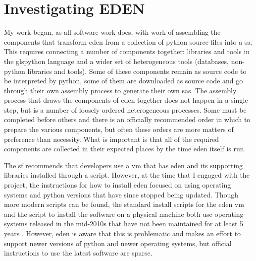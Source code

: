 \documentclass[a4paper,man,natbib]{apa6}
\begin{document}
  \section*{Investigating EDEN}
   My work began, as all software work does, with work of assembling the components that transform \acrshort{eden} from a collection of \gls{python} source files into a \gls{sa}. This requires connecting a number of components together: libraries and tools in the gls{python} language and a wider set of heterogeneous tools (databases, non-\gls{python} libraries and tools). Some of these components remain as source code to be interpreted by \gls{python}, some of them are downloaded as source code and go through their own assembly process to generate their own \glspl{sa}. The assembly process that draws the components of \acrshort{eden} together does not happen in a single step, but is a number of loosely ordered heterogeneous processes. Some must be completed before others and there is an officially recommended order in which to prepare the various components, but often these orders are more matters of preference than necessity. What is important is that all of the required components are collected in their expected places by the time \acrshort{eden} itself is run. 

   The \gls{sf} recommends that developers use a \gls{vm} that has \acrshort{eden} and its supporting libraries installed through a script. However, at the time that I engaged with the project, the instructions for how to install \acrshort{eden} focused on using operating systems and \gls{python} versions that have since stopped being updated. Though more modern scripts can be found, the standard install scripts for the \acrshort{eden} \gls{vm} and the script to install the software on a physical machine both use operating systems released in the mid-2010s that have not been maintained for at least 5 years \citep{Canonical2020-ru}. However, \acrshort{eden} is aware that this is problematic and makes an effort to support newer versions of \gls{python} and newer operating systems, but official instructions to use the latest software are sparse.
\end{document}
